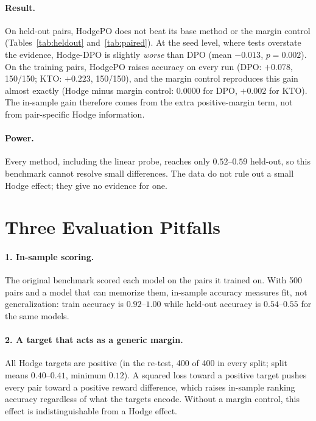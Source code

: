 \documentclass{article}
\begin{document}
\paragraph{Result.} On held-out pairs, HodgePO does not beat its base method or the margin control (Tables~\ref{tab:heldout} and~\ref{tab:paired}). At the seed level, where tests overstate the evidence, Hodge-DPO is slightly \emph{worse} than DPO (mean $-0.013$, $p = 0.002$). On the training pairs, HodgePO raises accuracy on every run (DPO: $+0.078$, 150/150; KTO: $+0.223$, 150/150), and the margin control reproduces this gain almost exactly (Hodge minus margin control: $0.0000$ for DPO, $+0.002$ for KTO). The in-sample gain therefore comes from the extra positive-margin term, not from pair-specific Hodge information.

\paragraph{Power.} Every method, including the linear probe, reaches only $0.52$--$0.59$ held-out, so this benchmark cannot resolve small differences. The data do not rule out a small Hodge effect; they give no evidence for one.

\section{Three Evaluation Pitfalls}
\label{sec:pitfalls}

\paragraph{1. In-sample scoring.} The original benchmark scored each model on the pairs it trained on. With 500 pairs and a model that can memorize them, in-sample accuracy measures fit, not generalization: train accuracy is $0.92$--$1.00$ while held-out accuracy is $0.54$--$0.55$ for the same models.

\paragraph{2. A target that acts as a generic margin.} All Hodge targets are positive (in the re-test, 400 of 400 in every split; split means $0.40$--$0.41$, minimum $0.12$). A squared loss toward a positive target pushes every pair toward a positive reward difference, which raises in-sample ranking accuracy regardless of what the targets encode. Without a margin control, this effect is indistinguishable from a Hodge effect.
\end{document}
